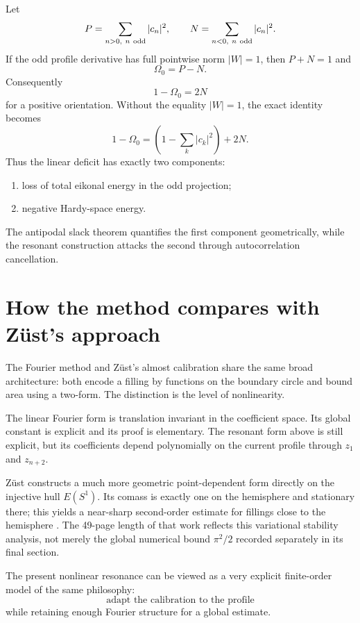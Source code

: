 \documentclass[11pt]{article}
\begin{document}
Let
\[
        P=\sum_{n>0,\ n\ {\rm odd}}|c_n|^2,\qquad
        N=\sum_{n<0,\ n\ {\rm odd}}|c_n|^2.
\]
If the odd profile derivative has full pointwise norm $|W|=1$, then
$P+N=1$ and
\[
        \Omega_0=P-N.
\]
Consequently
\begin{equation}\label{eq:Hardy-defect}
        \boxed{
        1-\Omega_0=2N}
\end{equation}
for a positive orientation.  Without the equality $|W|=1$, the exact
identity becomes
\[
        1-\Omega_0
        =
        \left(1-\sum_k|c_k|^2\right)
        +2N.
\]
Thus the linear deficit has exactly two components:
\begin{enumerate}[label=(\roman*)]
\item loss of total eikonal energy in the odd projection;
\item negative Hardy-space energy.
\end{enumerate}
The antipodal slack theorem quantifies the first component geometrically,
while the resonant construction attacks the second through autocorrelation
cancellation.

\section{How the method compares with Z\"ust's approach}

The Fourier method and Z\"ust's almost calibration share the same broad
architecture: both encode a filling by functions on the boundary circle and
bound area using a two-form.  The distinction is the level of nonlinearity.

The linear Fourier form is translation invariant in the coefficient space.
Its global constant is explicit and its proof is elementary.  The resonant
form above is still explicit, but its coefficients depend polynomially on
the current profile through $z_1$ and $z_{n+2}$.

Z\"ust constructs a much more geometric point-dependent form directly on
the injective hull $E(S^1)$.  Its comass is exactly one on the hemisphere
and stationary there; this yields a near-sharp second-order estimate for
fillings close to the hemisphere \cite{Zuest2025}.  The 49-page length of
that work reflects this variational stability analysis, not merely the
global numerical bound $\pi^2/2$ recorded separately in its final section.

The present nonlinear resonance can be viewed as a very explicit
finite-order model of the same philosophy:
\[
        \text{adapt the calibration to the profile}
\]
while retaining enough Fourier structure for a global estimate.
\end{document}
